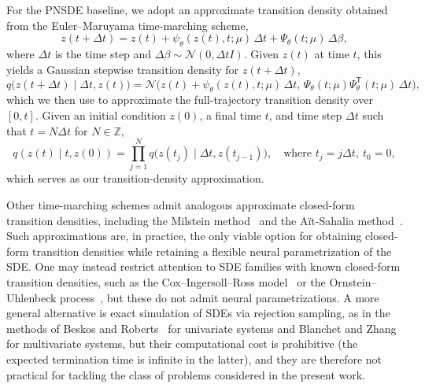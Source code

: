 \documentclass{article}
\begin{document}
	For the PNSDE baseline, we adopt an approximate transition density obtained from the Euler–Maruyama time-marching scheme,
	\begin{equation*}
		z(t+\Delta t) = z(t) + \psi_\theta(z(t), t; \mu)\,\Delta t + \Psi_\theta(t; \mu)\,\Delta \beta,
	\end{equation*}
	where $\Delta t$ is the time step and $\Delta \beta \sim \mathcal{N}(0, \Delta t I)$. Given $z(t)$ at time $t$, this yields a Gaussian stepwise transition density for $z(t+\Delta t)$,
	\begin{equation*}
		q\bigl(z(t+\Delta t)\mid \Delta t, z(t)\bigr) 
		= \mathcal{N}\bigl(z(t) + \psi_\theta(z(t), t; \mu)\,\Delta t,\,
		\Psi_\theta(t; \mu)\Psi_\theta^{\mathsf{T}}(t; \mu)\,\Delta t\bigr),
	\end{equation*}
	which we then use to approximate the full-trajectory transition density over $[0, t]$. Given an initial condition $z(0)$, a final time $t$, and time step $\Delta t$ such that $t = N \Delta t$ for $N \in \mathbb{Z}$,
	\begin{equation*}
		q(z(t)\mid t, z(0)) = \prod_{j=1}^{N} q\bigl(z(t_{j})\mid \Delta t, z(t_{j-1})\bigr),
		\quad \text{where } t_j = j\Delta t,\ t_0 = 0,
	\end{equation*}
	which serves as our transition-density approximation.
	
	Other time-marching schemes admit analogous approximate closed-form transition densities, including the Milstein method~\cite{Milstein_1979_Method_SDEs, Elerian_1998_Milstein_Density} and the A\"it-Sahalia method~\cite{Ait_Sahalia_2002_Method_SDEs}. Such approximations are, in practice, the only viable option for obtaining closed-form transition densities while retaining a flexible neural parametrization of the SDE. One may instead restrict attention to SDE families with known closed-form transition densities, such as the Cox–Ingersoll–Ross model~\cite{Cox_1985_CIR_Model} or the Ornstein–Uhlenbeck process~\cite{Uhlenbeck_1930_OU_Process}, but these do not admit neural parametrizations. A more general alternative is exact simulation of SDEs via rejection sampling, as in the methods of Beskos and Roberts~\cite{Beskos_2005_Exact_Simulation} for univariate systems and Blanchet and Zhang~\cite{Blanchet_2020_Exact_Simulation_Multivariate} for multivariate systems, but their computational cost is prohibitive (the expected termination time is infinite in the latter), and they are therefore not practical for tackling the class of problems considered in the present work.
	
\end{document}
